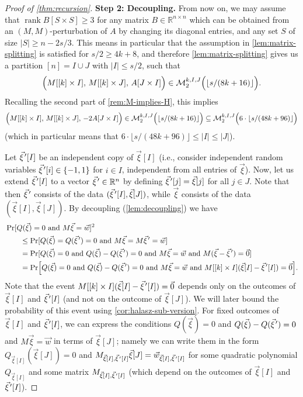 \documentclass[english]{article}
\theoremstyle{remark}
\numberwithin{equation}{section}
\numberwithin{figure}{section}
\newcommand{\pvec}[1]{\vec{#1}\mkern2mu\vphantom{#1}'}
\newcommand{\su}{\subseteq}
\newcommand{\RR}{\mathbb{R}}
\newcommand{\on}{\operatorname}
\begin{document}
\begin{proof}[Proof of \cref{thm:recursion}]
\textbf{Step 2: Decoupling.} From now on, we may assume that $\on{rank} B[S\times S]\ge 3$ for any matrix $B \in \RR^{n\times n}$ which can be obtained from an $(M,M)$-perturbation of $A$ by changing its diagonal entries, and any set $S$ of size $|S|\ge n-2s/3$. This means in particular that the assumption in \cref{lem:matrix-splitting} is satisfied for $s/2\ge 4k+8$, and therefore \cref{lem:matrix-splitting} gives us a partition $[n]=I\cup J$ with $|I|\le s/2$, such that
\[\Bigl(M[[k]\times I],\,M[[k]\times J],\,A[J\times I]\Bigr)\in\mathcal{M}_2^{k,I,J}\Bigl(\lfloor s/(8k+16)\rfloor \Bigr).\]
Recalling the second part of \cref{rem:M-implies-H}, this implies 
\begin{equation}
    \Bigl(M[[k]\times I],\,M[[k]\times J],\,-2A[J\times I]\Bigr)\in \mathcal{M}_2^{k,I,J}\Bigl(\lfloor s/(8k+16)\rfloor \Bigr)\su \mathcal{M}_2^{k,I,J}\Bigl(6\cdot \lfloor s/(48k+96)\rfloor\Bigr)
    \label{eq:splitting-condition}
\end{equation}
(which in particular means that $6\cdot \lfloor s/(48k+96)\rfloor\le |I|\le |J|$).

Let $\pvec{\xi}[I]$ be an independent copy of $\vec{\xi}[I]$ (i.e., consider independent random variables $\pvec{\xi}[i]\in \{-1,1\}$ for $i\in I$, independent from all entries of $\vec \xi$). Now, let us extend $\pvec{\xi}[I]$ to a vector $\pvec{\xi}\in \RR^n$ by defining $\pvec{\xi}[j]=\vec{\xi}[j]$ for all $j\in J$. Note that then $\pvec{\xi}$ consists of the data $(\pvec{\xi}[I],\vec{\xi}[J])$, while $\vec \xi$ consists of the data $(\vec{\xi}[I],\vec{\xi}[J])$. By decoupling (\cref{lem:decoupling})
we have
\begin{align}
&\Pr[Q(\vec{\xi})=0\text{ and }M\vec{\xi}=\vec{w}]^{2}\notag\\
&\quad\quad \le\Pr[Q(\vec{\xi})=Q(\pvec{\xi})=0\text{ and }M\vec{\xi}=M\pvec{\xi}=\vec{w}]\notag\\
 &\quad\quad =\Pr[Q(\vec{\xi})=0\text{ and }Q(\vec{\xi})-Q(\pvec{\xi})=0\text{ and }M\vec{\xi}=\vec{w}\text{ and }M(\vec{\xi}-\pvec{\xi})=\vec 0]\notag\\
 &\quad\quad =\Pr\Bigl[Q(\vec{\xi})=0\text{ and }Q(\vec{\xi})-Q(\pvec{\xi})=0\text{ and }M\vec{\xi}=\vec{w}\text{ and }M[[k]\times I](\vec{\xi}[I]-\pvec{\xi}[I])=\vec 0\Bigr].\label{eq:recursion-decoupling}
\end{align}
Note that the event $M[[k]\times I](\vec{\xi}[I]-\pvec{\xi}[I])=\vec 0$ depends only on the outcomes of $\vec{\xi}[I]$ and $\pvec{\xi}[I]$ (and not on the outcome of $\vec{\xi}[J]$). We will later bound the probability of this event using \cref{cor:halasz-sub-version}. For fixed outcomes of $\vec{\xi}[I]$ and $\pvec{\xi}[I]$, we can express the conditions $Q(\vec{\xi})=0$ and $Q(\vec{\xi})-Q(\pvec{\xi})=0$ and $M\vec{\xi}=\vec{w}$ in terms of $\vec \xi [J]$; namely we can write them in the form $Q_{\vec \xi[I]}(\vec{\xi}[J])=0$ and $M_{\vec \xi[I],\pvec{\xi}[I]}\vec\xi[J]=\vec{w}_{\vec \xi[I],\pvec{\xi}[I]}$ for some quadratic polynomial $Q_{\vec \xi[I]}$ and some matrix $M_{\vec \xi[I],\pvec{\xi}[I]}$ (which depend on the outcomes of $\vec{\xi}[I]$ and $\pvec{\xi}[I]$).


\end{proof}
\end{document}

